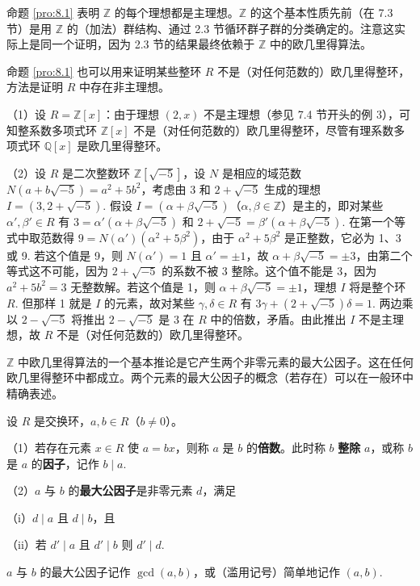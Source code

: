 命题 \ref{pro:8.1} 表明 \(\mathbb{Z}\) 的每个理想都是主理想。\(\mathbb{Z}\) 的这个基本性质先前（在 7.3 节）是用 \(\mathbb{Z}\) 的（加法）群结构、通过 2.3 节循环群子群的分类确定的。注意这实际上是同一个证明，因为 2.3 节的结果最终依赖于 \(\mathbb{Z}\) 中的欧几里得算法。

命题 \ref{pro:8.1} 也可以用来证明某些整环 \(R\) 不是（对任何范数的）欧几里得整环，方法是证明 \(R\) 中存在非主理想。

\begin{example}
（1）设 \(R = \mathbb{Z}[x]\)：由于理想 \((2, x)\) 不是主理想（参见 7.4 节开头的例 3），可知整系数多项式环 \(\mathbb{Z}[x]\) 不是（对任何范数的）欧几里得整环，尽管有理系数多项式环 \(\mathbb{Q}[x]\) 是欧几里得整环。

（2）设 \(R\) 是二次整数环 \(\mathbb{Z}[\sqrt{-5}]\)，设 \(N\) 是相应的域范数 \(N(a+b\sqrt{-5}) = a^2+5b^2\)，考虑由 3 和 \(2+\sqrt{-5}\) 生成的理想 \(I = (3, 2+\sqrt{-5})\). 假设 \(I = (\alpha + \beta\sqrt{-5})\)（\(\alpha, \beta \in \mathbb{Z}\)）是主的，即对某些 \(\alpha', \beta' \in R\) 有 \(3 = \alpha'(\alpha+\beta\sqrt{-5})\) 和 \(2+\sqrt{-5} = \beta'(\alpha+\beta\sqrt{-5})\). 在第一个等式中取范数得 \(9 = N(\alpha')(\alpha^2+5\beta^2)\)，由于 \(\alpha^2+5\beta^2\) 是正整数，它必为 1、3 或 9. 若这个值是 9，则 \(N(\alpha') = 1\) 且 \(\alpha' = \pm 1\)，故 \(\alpha+\beta\sqrt{-5} = \pm 3\)，由第二个等式这不可能，因为 \(2+\sqrt{-5}\) 的系数不被 3 整除。这个值不能是 3，因为 \(a^2+5b^2 = 3\) 无整数解。若这个值是 1，则 \(\alpha+\beta\sqrt{-5} = \pm 1\)，理想 \(I\) 将是整个环 \(R\). 但那样 1 就是 \(I\) 的元素，故对某些 \(\gamma, \delta \in R\) 有 \(3\gamma + (2+\sqrt{-5})\delta = 1\). 两边乘以 \(2-\sqrt{-5}\) 将推出 \(2-\sqrt{-5}\) 是 3 在 \(R\) 中的倍数，矛盾。由此推出 \(I\) 不是主理想，故 \(R\) 不是（对任何范数的）欧几里得整环。
\end{example}

\(\mathbb{Z}\) 中欧几里得算法的一个基本推论是它产生两个非零元素的最大公因子。这在任何欧几里得整环中都成立。两个元素的最大公因子的概念（若存在）可以在一般环中精确表述。

\begin{definition}
设 \(R\) 是交换环，\(a, b \in R\)（\(b \neq 0\)）。

（1）若存在元素 \(x \in R\) 使 \(a = bx\)，则称 \(a\) 是 \(b\) 的\textbf{倍数}。此时称 \(b\) \textbf{整除} \(a\)，或称 \(b\) 是 \(a\) 的\textbf{因子}，记作 \(b \mid a\).

（2）\(a\) 与 \(b\) 的\textbf{最大公因子}是非零元素 \(d\)，满足

（i）\(d \mid a\) 且 \(d \mid b\)，且

（ii）若 \(d' \mid a\) 且 \(d' \mid b\) 则 \(d' \mid d\).

\(a\) 与 \(b\) 的最大公因子记作 \(\gcd(a, b)\)，或（滥用记号）简单地记作 \((a, b)\).
\end{definition}

